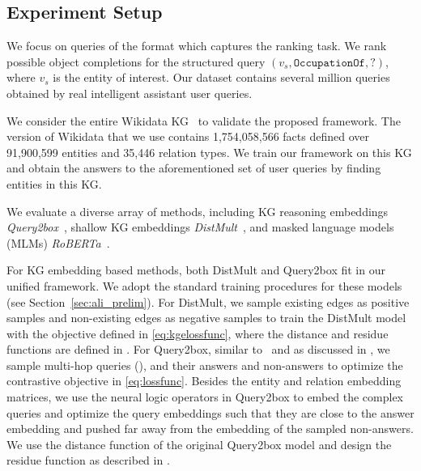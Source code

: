 \subsection{Experiment Setup}

We focus on queries of the format  which captures the ranking task. We rank possible object completions for the structured query $(v_s, \texttt{OccupationOf}, ?)$, where $v_s$ is the entity of interest. Our dataset contains several million queries obtained by real intelligent assistant user queries.

We consider the entire Wikidata KG~\cite{wikidata} to validate the proposed framework. The version of Wikidata that we use contains 1,754,058,566 facts defined over 91,900,599 entities and 35,446 relation types. We train our framework on this KG and obtain the answers to the aforementioned set of user queries by finding entities in this KG.

We evaluate a diverse array of methods, including KG reasoning embeddings \textit{Query2box}~\cite{ren2020query2box}, shallow KG embeddings \textit{DistMult}~\cite{distmult},  and masked language models (MLMs) \textit{RoBERTa}~\cite{liu2019roberta}. 

For KG embedding based methods, both DistMult and Query2box fit in our unified framework. We adopt the standard training procedures for these models (see Section~\ref{sec:ali_prelim}). For DistMult, we sample existing edges as positive samples and non-existing edges as negative samples to train the DistMult model with the objective defined in \eqref{eq:kgelossfunc}, where the distance and residue functions are defined in . For Query2box, similar to~\cite{ren2020query2box} and as discussed in , we sample multi-hop queries (), and their answers and non-answers to optimize the contrastive objective in \eqref{eq:lossfunc}. Besides the entity and relation embedding matrices, we use the neural logic operators in Query2box to embed the complex queries and optimize the query embeddings such that they are close to the answer embedding and pushed far away from the embedding of the sampled non-answers. We use the distance function of the original Query2box model and design the residue function as described in .








